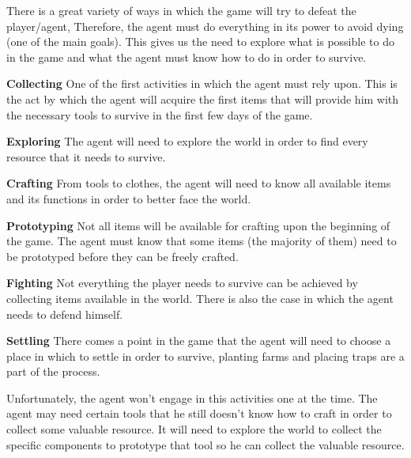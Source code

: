 There is a great variety of ways in which the game will try to defeat the player/agent, Therefore, the agent must do everything in its power to avoid dying (one of the main goals).
This gives us the need to explore what is possible to do in the game and what the agent must know how to do in order to survive.

\begin{description}
	\item \textbf{Collecting} One of the first activities in which the agent must rely upon.
This is the act by which the agent will acquire the first items that will provide him with the necessary tools to survive in the first few days of the game.
	\item \textbf{Exploring} The agent will need to explore the world in order to find every resource that it needs to survive.
	\item \textbf{Crafting} From tools to clothes, the agent will need to know all available items and its functions in order to better face the world.
	\item \textbf{Prototyping} Not all items will be available for crafting upon the beginning of the game.
The agent must know that some items (the majority of them) need to be prototyped before they can be freely crafted.
	\item \textbf{Fighting} Not everything the player needs to survive can be achieved by collecting items available in the world.
There is also the case in which the agent needs to defend himself.
	\item \textbf{Settling} There comes a point in the game that the agent will need to choose a place in which to settle in order to survive, planting farms and placing traps are a part of the process.
\end{description}

Unfortunately, the agent won’t engage in this activities one at the time.
The agent may need certain tools that he still doesn’t know how to craft in order to collect some valuable resource.
It will need to explore the world to collect the specific components to prototype that tool so he can collect the valuable resource.

